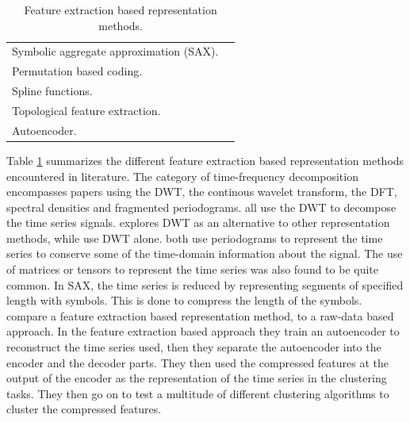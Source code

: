 \begin{table}[h]
\begin{tabular}{p{}p{}}
        Symbolic aggregate approximation (SAX). & \cite{clust_large_datasets_aghabozorg, apxdist_sax_k_modes, shape_feat_mod_tsc_rfa} \\
        Permutation based coding.               & \cite{dependency_tsc_energy_markets} \\
        Spline functions.                       & \cite{hier_clust_w_state_space_models} \\
        Topological feature extraction.         & \cite{topology_for_shape_based_tsc, } \\
        Autoencoder.                            & \cite{auto_encoder_many_tsc_algorithms} \\
        \bottomrule
    \end{tabular}
    \caption{Feature extraction based representation methods.}
    \label{tab:feat_repr_meth}
\end{table}

Table \ref{tab:feat_repr_meth} summarizes the different feature extraction based representation methods encountered in literature. 
The category of time-frequency decomposition encompasses papers using the DWT, the continous wavelet transform, the DFT, spectral densities and fragmented periodograms.
\textcite{shape_feat_mod_tsc_rfa, ambient_air_vape_k_means, dwt_hac_kmeans_som} all use the DWT to decompose the time series signals. 
\textcite{shape_feat_mod_tsc_rfa} explores DWT as an alternative to other representation methods, while \textcite{ambient_air_vape_k_means, dwt_hac_kmeans_som} use DWT alone.
\textcite{fragmented_periodogram, BSLEX_nonlin_nonstat_tsc} both use periodograms to represent the time series to conserve some of the time-domain information about the signal. 
The use of matrices or tensors to represent the time series was also found to be quite common. 
In SAX, the time series is reduced by representing segments of specified length with symbols.
This is done to compress the length of the symbols. 
\textcite{auto_encoder_many_tsc_algorithms} compare a feature extraction based representation method, to a raw-data based approach. 
In the feature extraction based approach they train an autoencoder to reconstruct the time series used, then they separate the autoencoder into the encoder and the decoder parts. 
They then used the compressed features at the output of the encoder as the representation of the time series in the clustering tasks. 
They then go on to test a multitude of different clustering algorithms to cluster the compressed features. \bigskip

